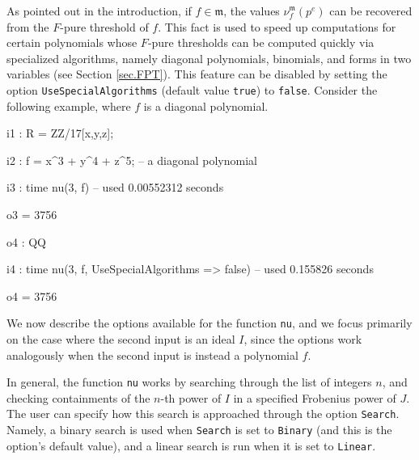 \documentclass{amsart}
\begin{document}
As pointed out in the introduction, if $f \in \mathfrak{m}$, the values $\nu^{\mathfrak{m}}_f(p^e)$ can be recovered from the $F$-pure threshold of $f$.
This fact is used to speed up computations for certain polynomials whose $F$-pure thresholds can be computed quickly via specialized algorithms, namely diagonal polynomials, binomials, and forms in two variables (see Section \ref{sec.FPT}).  This feature can be disabled by setting the option {\tt UseSpecialAlgorithms} (default value {\tt true}) to {\tt false}.  Consider the following example, where $f$ is a diagonal polynomial.

{\small
{}
\begin{MyVerbatim}

i1 : R = ZZ/17[x,y,z];

i2 : f = x^3 + y^4 + z^5; -- a diagonal polynomial

i3 : time nu(3, f)
     -- used 0.00552312 seconds

o3 = 3756

o4 : QQ

i4 : time nu(3, f, UseSpecialAlgorithms => false)
     -- used 0.155826 seconds

o4 = 3756
\end{MyVerbatim}
}
\medspace


We now describe the options available for the function {\tt nu}, and we focus primarily on the case where the second input is an ideal $I$, since the options work analogously when the second input is instead a polynomial $f$.

In general, the function {\tt nu} works by searching through the list of integers $n$, and checking containments of the $n$-th power of $I$ in a specified Frobenius power of $J$.
The user can specify how this search is approached through the  option {\tt Search}.  Namely, a binary search is used when {\tt Search} is set to {\tt Binary} (and this is the option's default value), and a linear search is run when it is set to {\tt Linear}.
\end{document}
